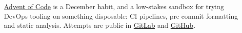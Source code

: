 \descript{ }
\href{https://adventofcode.com/}{Advent of Code} is a December habit, and a low-stakes sandbox for trying DevOps tooling on something disposable: CI pipelines, pre-commit formatting and static analysis. Attempts are public in \href{https://gitlab.com/laywill/}{GitLab} and \href{https://github.com/laywill}{GitHub}.
\sectionsep{}
